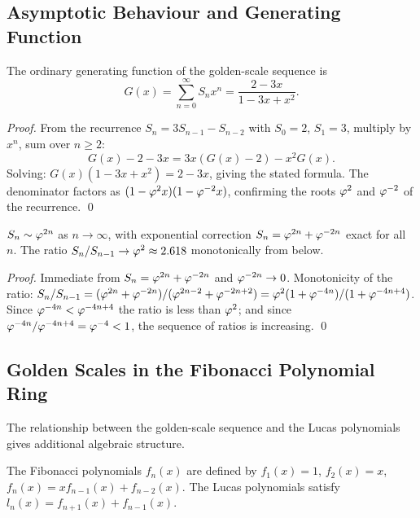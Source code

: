 \subsection{Asymptotic Behaviour and Generating Function}
\label{subsec:gs-asymp}

\begin{proposition}\label{prop:gs-gf}
The ordinary generating function of the golden-scale sequence is
\[
  G(x) = \sum_{n=0}^{\infty} S_n x^n
       = \frac{2 - 3x}{1 - 3x + x^2} .
\]
\end{proposition}

\begin{proof}
From the recurrence \(S_n = 3S_{n-1} - S_{n-2}\) with \(S_0 = 2\),
\(S_1 = 3\), multiply by \(x^n\), sum over \(n \ge 2\):
\[
  G(x) - 2 - 3x = 3x(G(x)-2) - x^2 G(x) .
\]
Solving: \(G(x)(1 - 3x + x^2) = 2 - 3x\), giving the stated formula.
The denominator factors as \((1 - \varphi^{2}x)(1 - \varphi^{-2}x)\),
confirming the roots \(\varphi^{2}\) and \(\varphi^{-2}\) of the
recurrence.
\qed
\end{proof}

\begin{corollary}[Asymptotic]\label{cor:gs-asymp}
\(S_n \sim \varphi^{2n}\) as \(n \to \infty\), with exponential
correction \(S_n = \varphi^{2n} + \varphi^{-2n}\) exact for all~\(n\).
The ratio \(S_n/S_{n-1} \to \varphi^{2} \approx 2.618\) monotonically
from below.
\end{corollary}

\begin{proof}
Immediate from \(S_n = \varphi^{2n} + \varphi^{-2n}\) and
\(\varphi^{-2n} \to 0\).  Monotonicity of the ratio:
\(S_n/S_{n-1} = (\varphi^{2n}+\varphi^{-2n})/(\varphi^{2n-2}+\varphi^{-2n+2})
= \varphi^{2}(1 + \varphi^{-4n})/(1+\varphi^{-4n+4})\).  Since
\(\varphi^{-4n} < \varphi^{-4n+4}\) the ratio is less than \(\varphi^{2}\);
and since \(\varphi^{-4n}/\varphi^{-4n+4} = \varphi^{-4} < 1\), the
sequence of ratios is increasing.
\qed
\end{proof}

\subsection{Golden Scales in the Fibonacci Polynomial Ring}
\label{subsec:gs-fpoly}

The relationship between the golden-scale sequence and the Lucas
polynomials gives additional algebraic structure.

\begin{definition}\label{def:gs-fibpoly}
The Fibonacci polynomials \(f_n(x)\) are defined by
\(f_1(x) = 1\), \(f_2(x) = x\), \(f_n(x) = x f_{n-1}(x) +
f_{n-2}(x)\).  The Lucas polynomials satisfy \(l_n(x) = f_{n+1}(x) +
f_{n-1}(x)\).
\end{definition}

